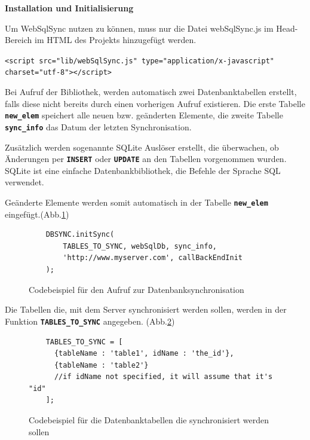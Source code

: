 \textbf{Installation und Initialisierung}

Um WebSqlSync nutzen zu können, muss nur die Datei webSqlSync.js im Head-Bereich im \ac{HTML} des Projekts hinzugefügt werden.

\lstset{language=html}
\lstinline$<script src="lib/webSqlSync.js" type="application/x-javascript" charset="utf-8"></script>$

Bei Aufruf der Bibliothek, werden automatisch zwei Datenbanktabellen erstellt, falls diese nicht bereits durch einen vorherigen Aufruf existieren. Die erste Tabelle \textbf{\lstinline$new_elem$} speichert alle neuen bzw. geänderten Elemente, die zweite Tabelle \textbf{\lstinline$sync_info$} das Datum der letzten Synchronisation.

Zusätzlich werden sogenannte SQLite Auslöser erstellt, die überwachen, ob Änderungen per \textbf{\lstinline$INSERT$} oder \textbf{\lstinline$UPDATE$} an den Tabellen vorgenommen wurden. SQLite ist eine einfache Datenbankbibliothek, die Befehle der Sprache \ac{SQL} verwendet.

Geänderte Elemente werden somit automatisch in der Tabelle \textbf{\lstinline$new_elem$} eingefügt.(Abb.\ref{code:initsync})

\begin{figure}[htb]
	\lstset{language=html}
	\begin{lstlisting}
	DBSYNC.initSync(
		TABLES_TO_SYNC, webSqlDb, sync_info,
		'http://www.myserver.com', callBackEndInit
	);\end{lstlisting}
	\caption{Codebeispiel für den Aufruf zur Datenbanksynchronisation}
	\label{code:initsync}
\end{figure}

\hspace{1 cm}

Die Tabellen die, mit dem Server synchronisiert werden sollen, werden in der Funktion \textbf{\lstinline$TABLES_TO_SYNC$} angegeben. (Abb.\ref{code:tabletosync})

\begin{figure}[htb]
	\lstset{language=html}
	\begin{lstlisting}
	TABLES_TO_SYNC = [
	  {tableName : 'table1', idName : 'the_id'},
	  {tableName : 'table2'}
	  //if idName not specified, it will assume that it's "id"
	];
	\end{lstlisting}
	\caption{Codebeispiel für die Datenbanktabellen die synchronisiert werden sollen}
	\label{code:tabletosync}
\end{figure}

